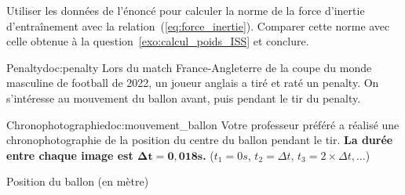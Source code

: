 \begin{coupDePouce}
  Utiliser les données de l'énoncé pour calculer la norme de la force d'inertie d'entraînement avec la relation~(\ref{eq:force_inertie}). 
  Comparer cette norme avec celle obtenue à la question~\ref{exo:calcul_poids_ISS} et conclure.
\end{coupDePouce}



\vspace*{-8pt}
\begin{doc}{Penalty}{doc:penalty}
  Lors du match France-Angleterre de la coupe du monde masculine de football de 2022, un joueur anglais a tiré et raté un penalty.
  On s'intéresse au mouvement du ballon avant, puis pendant le tir du penalty.
\end{doc}



\vspace*{-8pt}
\begin{doc}{Chronophotographie}{doc:mouvement_ballon}
  Votre professeur préféré a réalisé une chronophotographie de la position du centre du ballon pendant le tir. \textbf{La durée entre chaque image est $\mathbf{\Delta t = 0,\!018 \unit{s}}$.} ($t_1 = 0\unit{s}$, $t_2 = \Delta t$, $t_3 = 2\times \Delta t, \ldots$)
  \begin{center}
    
    \small{
      Position du ballon (en mètre)
    }
  \end{center}
\end{doc}




